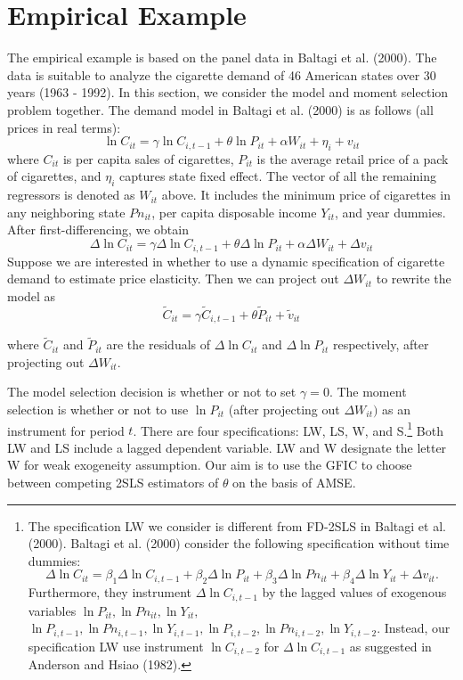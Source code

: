 \documentclass[11pt]{article}
\begin{document}
\section*{Empirical Example}

\vspace{0.1in}
The empirical example is based on the panel data in Baltagi et al. (2000). The data is suitable to analyze the cigarette demand of 46 American states over 30 years (1963 - 1992). In this section, we consider the model and moment selection problem together. The demand model in Baltagi et al. (2000) is as follows (all prices in real terms): 
\[
\ln C_{it} =  \gamma \ln C_{i,t-1} + \theta \ln P_{it} + \alpha W_{it} + \eta_i +  v_{it}
\] 
where $C_{it}$ is per capita sales of cigarettes, $P_{it}$ is the average retail price of a pack of cigarettes, and $\eta_i$ captures state fixed effect. The vector of all the remaining regressors is denoted as $W_{it}$ above. It includes the minimum price of cigarettes in any neighboring state $Pn_{it}$, per capita disposable income $Y_{it}$, and year dummies. After first-differencing, we obtain 
\[
\Delta \ln C_{it} = \gamma \Delta \ln C_{i,t-1} +  \theta \Delta \ln P_{it} +\alpha \Delta W_{it} +  \Delta v_{it}
\]
 Suppose we are interested in whether to use a dynamic specification of cigarette demand to estimate price elasticity. Then we can project out $\Delta W_{it}$ to rewrite the model as
\[
\widetilde{C}_{it} = \gamma \widetilde{C}_{i,t-1} + \theta \widetilde{P}_{it} + \widetilde{v}_{it} 
\] 
 
 where $\widetilde{C}_{it}$ and $\widetilde{P}_{it}$ are the residuals of $\Delta \ln C_{it}$ and $\Delta \ln P_{it}$ respectively, after projecting out $\Delta W_{it}$.
 
The model selection decision is whether or not to set $\gamma = 0$. The moment selection is whether or not to use $\ln P_{it}$ (after projecting out $\Delta W_{it})$ as an instrument for period $t$.  There are four specifications:  LW, LS, W, and S.\footnote{The specification LW we consider is different from FD-2SLS in Baltagi et al. (2000). Baltagi et al. (2000) consider the following specification without time dummies:
 \[
\Delta \ln C_{it} = \beta_1 \Delta \ln C_{i,t-1} +  \beta_2 \Delta \ln P_{it} +\beta_3 \Delta \ln Pn_{it} +  \beta_4 \Delta \ln Y_{it} + \Delta v_{it}.
\]
Furthermore, they instrument $\Delta \ln C_{i,t-1}$ by the lagged values of exogenous variables $\ln P_{it}, \ln Pn_{it}, \ln Y_{it},$ $\ln P_{i,t-1}, \ln Pn_{i,t-1}, \ln Y_{i,t-1}, \ln P_{i,t-2}, \ln Pn_{i,t-2}, \ln Y_{i,t-2}$. Instead, our specification LW use instrument $\ln C_{i, t-2}$ for $\Delta \ln C_{i,t-1}$ as suggested in Anderson and Hsiao (1982).}
 Both LW and LS include a lagged dependent variable. LW and W designate the letter W for weak exogeneity assumption. Our aim is to use the GFIC to choose between competing 2SLS estimators of $\theta$ on the basis of AMSE. %
\newpage
\end{document}
